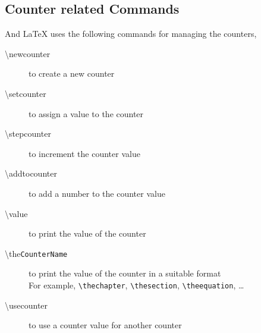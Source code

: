 \documentclass{article}
\theoremstyle{definition}
\theoremstyle{remark}
\begin{document}
\subsection{Counter related Commands}
	And \LaTeX{} uses the following commands for managing the counters,
\begin{description}
	\item[\textbackslash newcounter] to create a new counter
	\item[\textbackslash setcounter] to assign a value to the counter
	\item[\textbackslash stepcounter] to increment the counter value
	\item[\textbackslash addtocounter] to add a number to the counter value
	\item[\textbackslash value] to print the value of the counter
	\item[\textbackslash the\texttt{CounterName}] to print the value of the counter in a suitable format\\
		For example, \texttt{\textbackslash thechapter}, \texttt{\textbackslash thesection}, \texttt{\textbackslash theequation}, \dots
	\item[\textbackslash usecounter] to use a counter value for another counter
\end{description}
\end{document}
